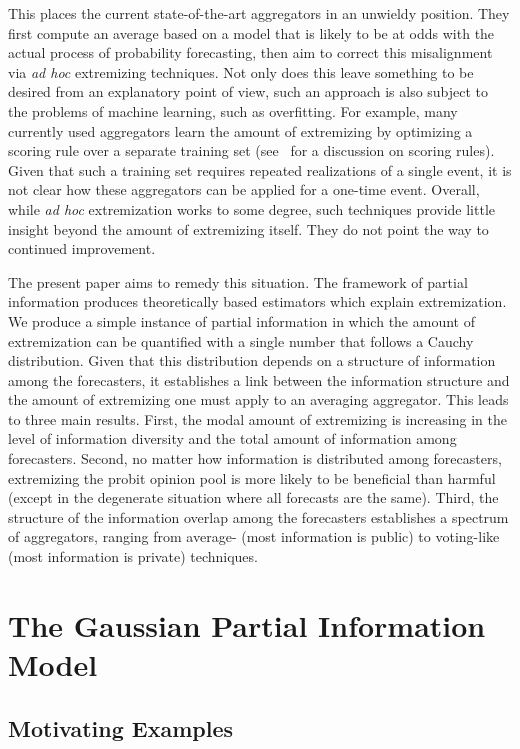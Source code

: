 \documentclass[11pt]{article}
\theoremstyle{definition}
\theoremstyle{definition}
\begin{document}
This places the current state-of-the-art aggregators in an unwieldy
position.  They first compute an average based on a model that
is likely to be at odds with the actual process of probability
forecasting, then aim to correct this misalignment via {\em ad hoc} 
extremizing techniques.  
%
Not only does this leave something to be desired from an explanatory 
point of view, such an approach is also subject to the problems of 
machine learning, such as overfitting.  For example, many currently
used aggregators learn the amount of extremizing by optimizing a scoring
rule over a separate training set (see~\citealt{Gneiting04strictlyproper} 
for a discussion on scoring rules).
Given that such a training set requires repeated realizations of
a single event, it is not clear how these aggregators can be applied
for a one-time event. Overall, while {\em ad hoc} extremization works to some degree, such
techniques provide little insight beyond the amount of extremizing
itself.  They do not point the way to continued improvement.

The present paper aims to remedy this situation.
The framework of partial information produces theoretically
based estimators which explain extremization.  We produce a 
simple instance of partial information in which the amount of 
extremization can be quantified with a single number
that follows a Cauchy distribution.  Given that this distribution
depends on a structure of information among the forecasters, it establishes
a link between the information structure and the amount of
extremizing one must apply to an averaging aggregator.  This leads
to three main results.  First, the modal amount of extremizing is 
increasing in the level of information diversity and the total amount 
of information among forecasters.  Second, no matter how information is 
distributed among forecasters, extremizing the probit opinion pool
is more likely to be beneficial than harmful (except in the degenerate
situation where all forecasts are the same). Third, the structure of the information overlap among the forecasters establishes a spectrum of aggregators, ranging from average- (most information is public) to voting-like (most information is private) techniques. 


\section{The Gaussian Partial Information Model}
\label{sec:model}

\subsection{Motivating Examples}
\end{document}
